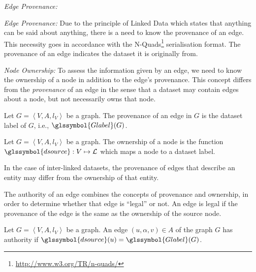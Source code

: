 \begin{labeling}{\emph{Edge Provenance:}}
	\item[\emph{Edge Provenance:}] Due to the principle of Linked Data which states that anything can be said about anything, there is a need to know the provenance of an edge. This necessity goes in accordance with the N-Quads\footnote{\url{http://www.w3.org/TR/n-quads/}} serialisation format. The provenance of an edge indicates the dataset it is originally from.

	\item[\emph{Node Ownership:}] To assess the information given by an edge, we need to know the ownership of a node in addition to the edge's provenance. This concept differs from the \emph{provenance} of an edge in the sense that a dataset may contain edges about a node, but not necessarily owns that node.
\end{labeling}

\begin{definition}
	Let $G = \left\langle V, A, l_V \right\rangle$ be a graph. The provenance of an edge in $G$ is the dataset label of $G$, i.e., $\glssymbol{Glabel}(G)$.
\end{definition}

\begin{definition}
	Let $G = \left\langle V, A, l_V \right\rangle$ be a graph. The ownership of a node is the function $\glssymbol{dsource} : V \mapsto \mathcal{L}$ which maps a node to a dataset label.
\end{definition}

\begin{remark}
	In the case of inter-linked datasets, the provenance of edges that describe an entity may differ from the ownership of that entity.
\end{remark}

The authority of an edge combines the concepts of provenance and ownership, in order to determine whether that edge is ``legal'' or not. An edge is legal if the provenance of the edge is the same as the ownership of the source node.

\begin{definition}
	Let $G = \left\langle V, A, l_V \right\rangle$ be a graph.
	An edge $(u, \alpha, v) \in A$ of the graph $G$ has authority if $\glssymbol{dsource}(u) = \glssymbol{Glabel}(G)$.
	\label{chap4:summary:def:edge-authority}
\end{definition}

